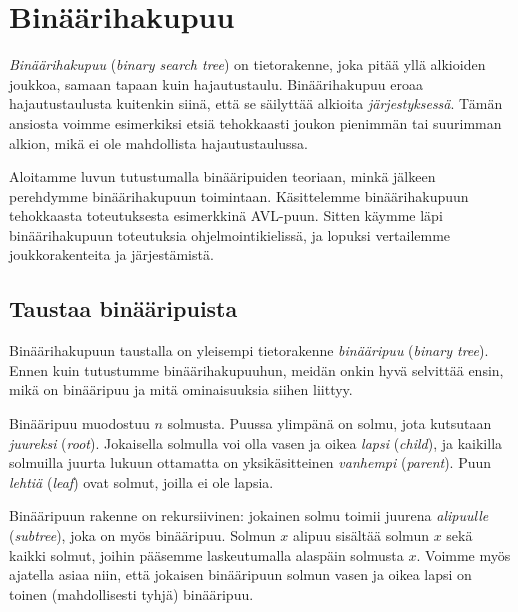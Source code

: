 \chapter{Binäärihakupuu}


\emph{Binäärihakupuu} (\emph{binary search tree})
on tietorakenne, joka pitää yllä
alkioiden joukkoa, samaan tapaan kuin hajautustaulu.
Binäärihakupuu eroaa hajautustaulusta kuitenkin siinä,
että se säilyttää alkioita \emph{järjestyksessä}.
Tämän ansiosta voimme esimerkiksi etsiä tehokkaasti
joukon pienimmän tai suurimman alkion,
mikä ei ole mahdollista hajautustaulussa.

Aloitamme luvun tutustumalla binääripuiden teoriaan,
minkä jälkeen perehdymme binäärihakupuun toimintaan.
Käsittelemme binäärihakupuun tehokkaasta toteutuksesta
esimerkkinä AVL-puun.
Sitten käymme läpi binääri\-hakupuun toteutuksia
ohjelmointikielissä,
ja lopuksi vertailemme joukkorakenteita ja järjestämistä.

\section{Taustaa binääripuista}


Binäärihakupuun taustalla on yleisempi tietorakenne \emph{binääripuu}
(\emph{binary tree}).
Ennen kuin tutustumme binäärihakupuuhun,
meidän onkin hyvä selvittää ensin, mikä on binääripuu ja mitä
ominaisuuksia siihen liittyy.


Binääripuu muodostuu $n$ solmusta.
Puussa ylimpänä on solmu, jota kutsutaan \emph{juureksi} (\emph{root}).
Jokaisella solmulla voi olla vasen ja oikea \emph{lapsi} (\emph{child}),
ja kaikilla solmuilla juurta lukuun ottamatta on yksikäsitteinen
\emph{vanhempi} (\emph{parent}).
Puun \emph{lehtiä} (\emph{leaf}) ovat solmut, joilla ei ole lapsia.


Binääripuun rakenne on rekursiivinen:
jokainen solmu toimii juurena \emph{alipuulle} (\emph{subtree}),
joka on myös binääripuu.
Solmun $x$ alipuu sisältää solmun $x$ sekä kaikki
solmut, joihin pääsemme laskeutumalla alaspäin solmusta $x$.
Voimme myös ajatella asiaa niin, että jokaisen binääripuun
solmun vasen ja oikea lapsi on toinen (mahdollisesti tyhjä) binääripuu.

